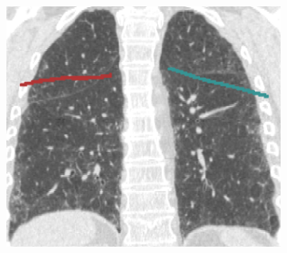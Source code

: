 {\begin{figure}[htbp]
\begin{subfigure}{.32\linewidth}%
  \includegraphics[width=\linewidth,trim={{.0\wd0} {.0\wd0} {.0\wd0} {.0\wd0}},clip]{Segmentation/Image/IPF203_PCAGuessing_Coronal364.png}

\end{subfigure}
\end{figure}}

